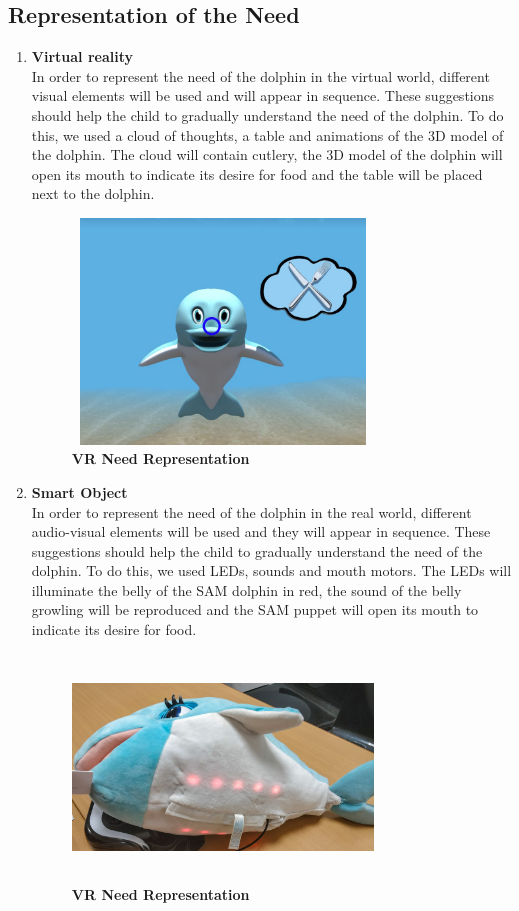 \documentclass [12pt]{article}
\begin{document}
\subsection{Representation of the Need}
\begin{enumerate}
\item \textbf{Virtual reality}\\
In order to represent the need of the dolphin in the virtual world, different visual elements will be used and will appear in sequence. These suggestions should help the child to gradually understand the need of the dolphin. To do this, we used a cloud of thoughts, a table and animations of the 3D model of the dolphin. The cloud will contain cutlery, the 3D model of the dolphin will open its mouth to indicate its desire for food and the table will be placed next to the dolphin. 
\begin{figure}[ht!]
\centering
\includegraphics[height=6cm,width=8cm]{NeedRepresentation.jpg}
\caption{\textbf{VR Need Representation}}
\end{figure}
\item \textbf{Smart Object}\\
In order to represent the need of the dolphin in the real world, different audio-visual elements will be used and they will appear in sequence. These suggestions should help the child to gradually understand the need of the dolphin. To do this, we used LEDs, sounds and mouth motors. The LEDs will illuminate the belly of the SAM dolphin in red, the sound of the belly growling will be reproduced and the SAM puppet will open its mouth to indicate its desire for food.
\begin{figure}[ht!]
\centering
\includegraphics[height=6cm,width=8cm]{NeedRepresentationSam.jpg}
\caption{\textbf{VR Need Representation}}
\end{figure} 
\end{enumerate}
\end{document}
